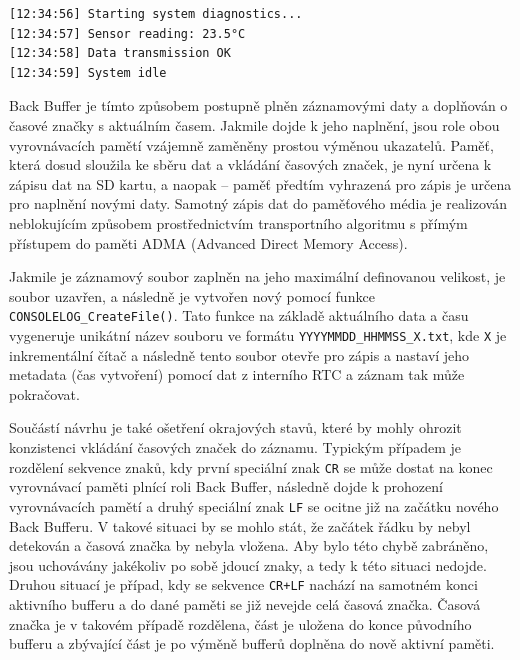 \begin{verbatim}
[12:34:56] Starting system diagnostics...
[12:34:57] Sensor reading: 23.5°C
[12:34:58] Data transmission OK
[12:34:59] System idle
\end{verbatim}

Back Buffer je tímto způsobem postupně plněn záznamovými daty a doplňován o časové značky s aktuálním časem. Jakmile dojde k jeho naplnění, jsou role obou vyrovnávacích pamětí vzájemně zaměněny prostou výměnou ukazatelů. Paměť, která dosud sloužila ke sběru dat a vkládání časových značek, je nyní určena k zápisu dat na SD kartu, a naopak – paměť předtím vyhrazená pro zápis je určena pro naplnění novými daty. Samotný zápis dat do paměťového média je realizován neblokujícím způsobem prostřednictvím transportního algoritmu s přímým přístupem do paměti ADMA (Advanced Direct Memory Access). \cite{nxp_MCX_Nx4x_Reference_Manual}

Jakmile je záznamový soubor zaplněn na jeho maximální definovanou velikost, je soubor uzavřen, a následně je vytvořen nový pomocí funkce \texttt{CONSOLELOG\_CreateFile()}. Tato funkce na základě aktuálního data a času vygeneruje unikátní název souboru ve formátu \texttt{YYYYMMDD\_HHMMSS\_X.txt}, kde \texttt{X} je inkrementální čítač a následně tento soubor otevře pro zápis a nastaví jeho metadata (čas vytvoření) pomocí dat z interního RTC a záznam tak může pokračovat.

Součástí návrhu je také ošetření okrajových stavů, které by mohly ohrozit konzistenci vkládání časových značek do záznamu. Typickým případem je rozdělení sekvence znaků, kdy první speciální znak \texttt{CR} se může dostat na konec vyrovnávací paměti plnící roli Back Buffer, následně dojde k prohození vyrovnávacích pamětí a druhý speciální znak \texttt{LF} se ocitne již na začátku nového Back Bufferu. V takové situaci by se mohlo stát, že začátek řádku by nebyl detekován a časová značka by nebyla vložena. Aby bylo této chybě zabráněno, jsou uchovávány jakékoliv po sobě jdoucí znaky, a tedy k této situaci nedojde. Druhou situací je případ, kdy se sekvence \texttt{CR+LF} nachází na samotném konci aktivního bufferu a do dané paměti se již nevejde celá časová značka. Časová značka je v takovém případě rozdělena, část je uložena do konce původního bufferu a zbývající část je po výměně bufferů doplněna do nově aktivní paměti.

